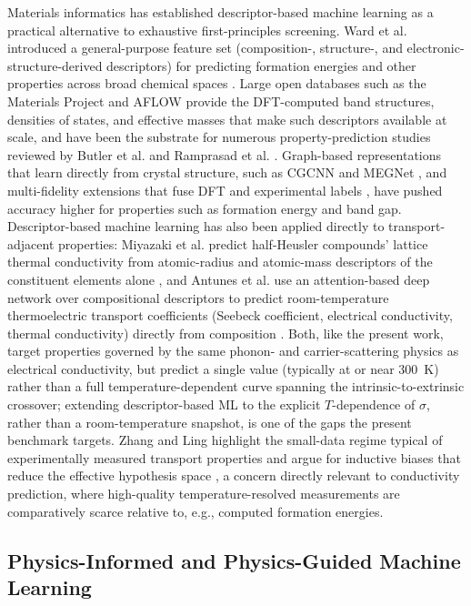 \documentclass[11pt]{article}
\begin{document}
Materials informatics has established descriptor-based machine learning as a practical alternative to exhaustive first-principles screening. Ward et al. introduced a general-purpose feature set (composition-, structure-, and electronic-structure-derived descriptors) for predicting formation energies and other properties across broad chemical spaces \citep{ward2016general}. Large open databases such as the Materials Project \citep{jain2013materialsproject} and AFLOW \citep{curtarolo2012aflow} provide the DFT-computed band structures, densities of states, and effective masses that make such descriptors available at scale, and have been the substrate for numerous property-prediction studies reviewed by Butler et al. and Ramprasad et al. \citep{butler2018machine,ramprasad2017machine}. Graph-based representations that learn directly from crystal structure, such as CGCNN \citep{xie2018crystal} and MEGNet \citep{chen2019graph}, and multi-fidelity extensions that fuse DFT and experimental labels \citep{chen2021learning}, have pushed accuracy higher for properties such as formation energy and band gap. Descriptor-based machine learning has also been applied directly to transport-adjacent properties: Miyazaki et al. predict half-Heusler compounds' lattice thermal conductivity from atomic-radius and atomic-mass descriptors of the constituent elements alone \citep{miyazaki2021thermal}, and Antunes et al. use an attention-based deep network over compositional descriptors to predict room-temperature thermoelectric transport coefficients (Seebeck coefficient, electrical conductivity, thermal conductivity) directly from composition \citep{antunes2023thermoelectric}. Both, like the present work, target properties governed by the same phonon- and carrier-scattering physics as electrical conductivity, but predict a single value (typically at or near 300~K) rather than a full temperature-dependent curve spanning the intrinsic-to-extrinsic crossover; extending descriptor-based ML to the explicit $T$-dependence of $\sigma$, rather than a room-temperature snapshot, is one of the gaps the present benchmark targets. Zhang and Ling highlight the small-data regime typical of experimentally measured transport properties and argue for inductive biases that reduce the effective hypothesis space \citep{zhang2018strategy}, a concern directly relevant to conductivity prediction, where high-quality temperature-resolved measurements are comparatively scarce relative to, e.g., computed formation energies.

\subsection{Physics-Informed and Physics-Guided Machine Learning}
\end{document}
